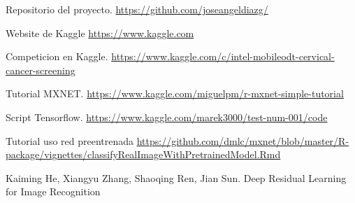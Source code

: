 % 

\begin{thebibliography}{99}

	\emph{} Repositorio del proyecto. \url{https://github.com/joseangeldiazg/}

	\emph{} Website de Kaggle \url{https://www.kaggle.com}	

	\emph{} Competicion en Kaggle. \url{https://www.kaggle.com/c/intel-mobileodt-cervical-cancer-screening}
	
	\emph{} Tutorial MXNET. \url{https://www.kaggle.com/miguelpm/r-mxnet-simple-tutorial}
	
	\emph{} Script Tensorflow. \url{https://www.kaggle.com/marek3000/test-num-001/code}
	
	\emph{} Tutorial uso red preentrenada \url{https://github.com/dmlc/mxnet/blob/master/R-package/vignettes/classifyRealImageWithPretrainedModel.Rmd}
	
	\emph{}Kaiming He, Xiangyu Zhang, Shaoqing Ren, Jian Sun. Deep Residual Learning for Image Recognition

\end{thebibliography}
